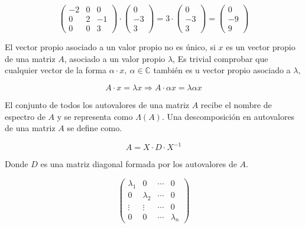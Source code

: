 \begin{equation*}
\begin{pmatrix}
-2& 0& 0\\
0& 2 & -1\\
0& 0& 3
\end{pmatrix}\cdot \begin{pmatrix}
0\\
-3\\
3
\end{pmatrix}=3\cdot \begin{pmatrix}
0\\
-3\\
3
\end{pmatrix}=\begin{pmatrix}
0\\
-9\\
9
\end{pmatrix}
\end{equation*}
\begin{paracol}{2}
El vector propio asociado a un valor propio no es único, si $x$ es un vector propio de una matriz $A$, asociado a un valor propio $\lambda$, Es trivial comprobar que cualquier vector de la forma $\alpha\cdot x, \ \alpha \in \mathbb{C}$ también es u vector propio asociado a $\lambda$,
\end{paracol}
\begin{equation}
A\cdot x= \lambda x \Rightarrow A \cdot \alpha x = \lambda  \alpha x
\end{equation}
\begin{paracol}{2}
El conjunto de todos los autovalores de una matriz $A$ recibe el nombre de espectro de $A$ y se representa como $\Lambda(A)$.
Una descomposición en autovalores de una matriz $A$ se define como.
\end{paracol}
\begin{equation*}
A=X\cdot D \cdot X^{-1}
\end{equation*}
\begin{paracol}{2}
Donde $D$ es una matriz diagonal formada por los autovalores de $A$. 
\end{paracol}
\begin{equation*}
\begin{pmatrix}
\lambda_1& 0 & \cdots & 0\\
0& \lambda_2& \cdots & 0\\
\vdots & \vdots& \cdots & 0\\
0& 0& \cdots & \lambda_n
\end{pmatrix}
\end{equation*}
